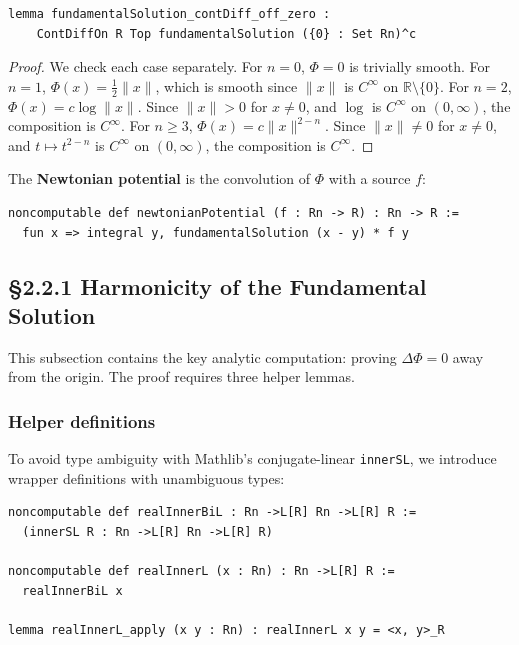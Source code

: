 ﻿\documentclass[12pt, a4paper]{article}
\renewcommand{\_}{\origunderscore\allowbreak}
\theoremstyle{definition}
\theoremstyle{plain}
\begin{document}
\begin{lstlisting}[caption={Fundamental solution smooth off zero (proved)}]
lemma fundamentalSolution_contDiff_off_zero :
    ContDiffOn R Top fundamentalSolution ({0} : Set Rn)^c
\end{lstlisting}

\begin{proof}
We check each case separately. For $n = 0$, $\Phi = 0$ is trivially smooth.
For $n = 1$, $\Phi(x) = \frac{1}{2}\|x\|$, which is smooth since $\|x\|$ is
$C^\infty$ on $\mathbb{R} \setminus \{0\}$.
For $n = 2$, $\Phi(x) = c\log\|x\|$. Since $\|x\| > 0$ for $x \neq 0$, and
$\log$ is $C^\infty$ on $(0,\infty)$, the composition is $C^\infty$.
For $n \geq 3$, $\Phi(x) = c\|x\|^{2-n}$. Since $\|x\| \neq 0$ for $x \neq 0$,
and $t \mapsto t^{2-n}$ is $C^\infty$ on $(0,\infty)$, the composition is $C^\infty$.
\end{proof}

The \textbf{Newtonian potential} is the convolution of $\Phi$ with a source $f$:

\begin{lstlisting}[caption={Newtonian potential}]
noncomputable def newtonianPotential (f : Rn -> R) : Rn -> R :=
  fun x => integral y, fundamentalSolution (x - y) * f y
\end{lstlisting}

\subsection{§2.2.1 Harmonicity of the Fundamental Solution}

This subsection contains the key analytic computation: proving $\Delta\Phi = 0$
away from the origin. The proof requires three helper lemmas.

\subsubsection{Helper definitions}

To avoid type ambiguity with Mathlib's conjugate-linear \texttt{innerSL}, we
introduce wrapper definitions with unambiguous types:

\begin{lstlisting}[caption={Real inner product CLMs (avoiding conjugate-linear ambiguity)}]
noncomputable def realInnerBiL : Rn ->L[R] Rn ->L[R] R :=
  (innerSL R : Rn ->L[R] Rn ->L[R] R)

noncomputable def realInnerL (x : Rn) : Rn ->L[R] R :=
  realInnerBiL x

lemma realInnerL_apply (x y : Rn) : realInnerL x y = <x, y>_R
\end{lstlisting}
\end{document}
